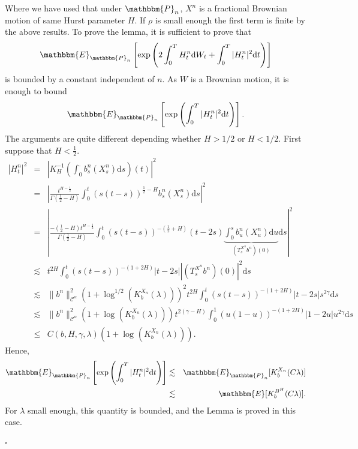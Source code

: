 \documentclass[a4paper,11pt]{article}
\newcommand{\mathd}{\mathrm{d}}
\newenvironment{proof}{{\sc Proof.}}{\hfill$\square$}
\newcommand{\CC}{\mathscr C}
\begin{document}
\begin{proof}
  
  Where we have used that under $\mathbbm{P}_{n}$, $X^{n}$ is a fractional
  Brownian motion of same Hurst parameter $H$. If $\rho$ is small enough the
  first term is finite by the above results. To prove the lemma, it is
  sufficient to prove that
  \[ \mathbbm{E}_{\mathbbm{P}_{n}} \left[ \exp   \left( 2 \int_{0}^{T}
     H^{n}_{t} \mathd W_{t} + \int_{0}^{T} | H^{n}_{t} |^{2} \mathd t \right)
     \right] \]
  is bounded by a constant independent of $n$. As $W$ is a Brownian motion, it
  is enough to bound
  \[ \mathbbm{E}_{\mathbbm{P}_{n}} \left[ \exp   \left( \int_{0}^{T} |
     H_{t}^{n} |^{2} \mathd t \right) \right]. \]
  The arguments are quite different depending whether $H>1/2$ or $H<1/2$.
  First suppose that $H< \frac{1}{2}$.
  \begin{eqnarray*}
    |H_{t}^{n} |^{2} & = & \left\lvert K_{H}^{-1} \left( \int_{0}^{.} b^{n}_{s}
    (X^{n}_{s} ) \mathd s \right) (t) \right\lvert^{2}\\
    & = & \left\lvert \frac{t^{H- \frac{1}{2}}}{\Gamma ( \frac{1}{2} -H)} 
    \int_{0}^{t} (s(t-s))^{\frac{1}{2} -H} b^{n}_{s} (X^{n}_{s} ) \mathd s
    \right\lvert^{2}\\
    & = & \left\lvert \frac{- \left( \frac{1}{2} -H \right) t^{H-
    \frac{1}{2}}}{\Gamma ( \frac{1}{2} -H)}  \int_{0}^{t} (s(t-s))^{-(
    \frac{1}{2} +H)} (t-2s) \underbrace{\int_{0}^{s} b^{n}_{u} (X^{n}_{u} )
    \mathd u}_{( T_{s}^{X^{n}} b^{n} ) (0)} \mathd s \right\lvert^{2}\\
    & \lesssim & t^{2H}  \int_{0}^{t} (s(t-s))^{- (1+2H)}  | t-2s | | (
    T_{s}^{X^{n}} b^{n} ) (0) |^{2} \mathd s\\
    & \lesssim & \|b^{n} \|_{\CC^{\alpha}}^{2} ( 1+ \log^{1/2} (
    K^{X_{n}}_{b} ( \lambda ) ) )^{2} t^{2H}  \int_{0}^{t} (s(t-s))^{- (1+2H)}
    | t-2s | s^{2 \gamma} \mathd s\\
    & \lesssim & \|b^{n} \|_{\CC^{\alpha}}^{2} ( 1+ \log^{} ( K^{X_{n}}_{b} (
    \lambda ) ) )^{} t^{2 ( \gamma -H)}  \int_{0}^{1} (u(1-u))^{- (1+2H)}  |
    1-2u | u^{2 \gamma} \mathd s\\
    & \leqslant & C (b,H, \gamma , \lambda ) ( 1+ \log^{} ( K^{X_{n}}_{b} (
    \lambda ) ) ).
  \end{eqnarray*}
  Hence,
  \begin{eqnarray*}
    \mathbbm{E}_{\mathbbm{P}_{n}} \left[ \exp   \left( \int_{0}^{T} |
    H_{t}^{n} |^{2} \mathd t \right) \right] & \lesssim &
    \mathbbm{E}_{\mathbbm{P}_{n}} [ K^{X_{n}}_{b} ( C \lambda ) ]\\
    & \lesssim & \mathbbm{E} [  K^{B^{H}}_{b} ( C \lambda ) ].
  \end{eqnarray*}
  For $\lambda$ small enough, this quantity is bounded, and the Lemma is
  proved in this case.
  

\end{proof}
\end{document}

